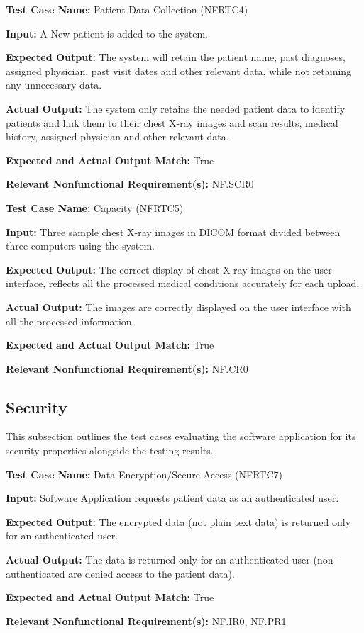 \documentclass[12pt, titlepage]{article}
\begin{document}
\begin{mdframed}[linewidth=0.5mm]
  \textbf{Test Case Name:} Patient Data Collection (NFRTC4) \par
  \textbf{Input:} A New patient is added to the system. \par
  \textbf{Expected Output:} The system will retain the patient name, past diagnoses, assigned physician, past visit dates and other relevant data, while not retaining any unnecessary data. \par
  \textbf{Actual Output:} The system only retains the needed patient data to identify patients and link them to their chest X-ray images and scan results, medical history, assigned physician and other relevant data. \par
  \textbf{Expected and Actual Output Match:} True \par
  \textbf{Relevant Nonfunctional Requirement(s):} NF.SCR0
\end{mdframed}

\begin{mdframed}[linewidth=0.5mm]
  \textbf{Test Case Name:} Capacity (NFRTC5) \par
  \textbf{Input:} Three sample chest X-ray images in DICOM format divided between three computers using the system. \par
  \textbf{Expected Output:} The correct display of chest X-ray images on the user interface, reflects all the processed medical conditions accurately for each upload. \par
  \textbf{Actual Output:} The images are correctly displayed on the user interface with all the processed information. \par
  \textbf{Expected and Actual Output Match:} True \par
  \textbf{Relevant Nonfunctional Requirement(s):} NF.CR0
\end{mdframed}

\subsection{Security}
This subsection outlines the test cases evaluating the software application for its security properties alongside the testing results. \\

\begin{mdframed}[linewidth=0.5mm]
  \textbf{Test Case Name:} Data Encryption/Secure Access (NFRTC7) \par
  \textbf{Input:} Software Application requests patient data as an authenticated user. \par
  \textbf{Expected Output:} The encrypted data (not plain text data) is returned only for an authenticated user. \par
  \textbf{Actual Output:} The data is returned only for an authenticated user (non-authenticated are denied access to the patient data). \par
  \textbf{Expected and Actual Output Match:} True \par
  \textbf{Relevant Nonfunctional Requirement(s):} NF.IR0, NF.PR1
\end{mdframed}
\end{document}
